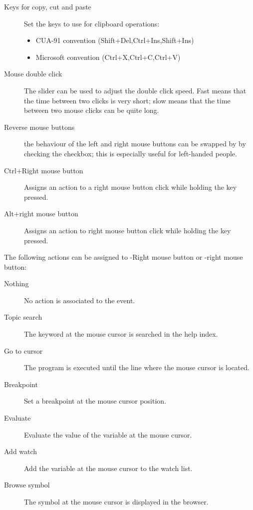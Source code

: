 
\begin{description}
\item[Keys for copy, cut and paste] Set the keys to use for clipboard
operations:
\begin{itemize}
\item CUA-91 convention (Shift+Del,Ctrl+Ins,Shift+Ins)
\item Microsoft convention (Ctrl+X,Ctrl+C,Ctrl+V)
\end{itemize}
\item[Mouse double click]
The slider can be used to adjust the double click speed. Fast means that the
time between two clicks is very short; slow means that the time between two
mouse clicks can be quite long.
\item[Reverse mouse buttons]
the behaviour of the left and right mouse buttons can be swapped by
by checking the checkbox; this is especially useful for left-handed people.
\item[Ctrl+Right mouse button]
Assigns an action to a right mouse button click while holding the
 key pressed.
\item[Alt+right mouse button]
Assigns an action to right mouse button click while holding the
 key pressed.
\end{description}

The following actions can be assigned to -Right mouse button or
-right mouse button:
\begin{description}
\item[Nothing] No action is associated to the event.
\item [Topic search] The keyword at the mouse cursor is searched in the
help index.
\item [Go to cursor] The program is executed until the line where
the mouse cursor is located.
\item [Breakpoint] Set a breakpoint at the mouse cursor position.
\item [Evaluate] Evaluate the value of the variable at the mouse
cursor.
\item [Add watch] Add the variable at the mouse cursor to the
watch list.
\item [Browse symbol] The symbol at the mouse cursor is displayed
in the browser.
\end{description}

